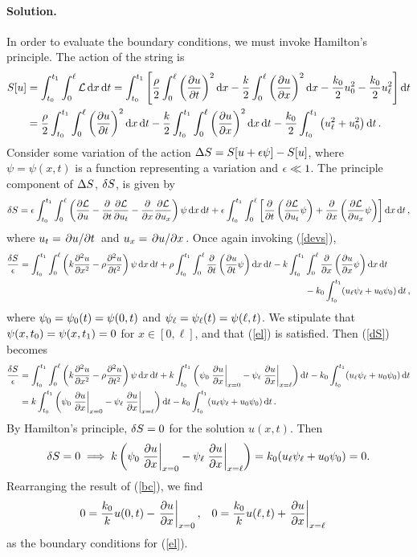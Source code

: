 \documentclass[11pt]{article}
\newcommand{\refeq}[1]{(\ref{#1})}
\newenvironment{solution}
{
    \paragraph{Solution.}
    \ignorespaces
}
{
}
\begin{document}
\begin{solution}
	In order to evaluate the boundary conditions, we must invoke Hamilton's principle.  The action of the string is
	\begin{align} \label{action}
		S[u] &= \int_{t_0}^{t_1} \int_0^\ell \mathcal{L} \dd{x} \dd{t} = \int_{t_0}^{t_1} \left[ \frac{\rho}{2} \int_0^\ell \bigg( \pdv{u}{t} \bigg)^2 \dd{x} - \frac{k}{2} \int_0^\ell \bigg( \pdv{u}{x} \bigg)^2 \dd{x} - \frac{k_0}{2} u_0^2 - \frac{k_0}{2} u_\ell^2 \right] \dd{t} \\
		&= \frac{\rho}{2} \int_{t_0}^{t_1} \int_0^\ell \bigg( \pdv{u}{t} \bigg)^2 \dd{x} \dd{t} - \frac{k}{2} \int_{t_0}^{t_1} \int_0^\ell \bigg( \pdv{u}{x} \bigg)^2 \dd{x} \dd{t} - \frac{k_0}{2} \int_{t_0}^{t_1} \left( u_\ell^2 + u_0^2 \right) \dd{t}.
	\end{align}
	Consider some variation of the action $\Delta S = S[u + \epsilon \psi] - S[u]$, where $\psi = \psi(x, t)$ is a function representing a variation and $\epsilon \ll 1$.  The principle component of $\Delta S$, $\delta S$, is given by
	\begin{equation}
		\delta S = \epsilon \int_{t_0}^{t_1} \int_0^\ell \left( \pdv{\mathcal{L}}{u} - \pdv{}{t} \pdv{\mathcal{L}}{u_t} - \pdv{}{x} \pdv{\mathcal{L}}{u_x} \right) \psi \dd{x} \dd{t} + \epsilon \int_{t_0}^{t_1} \int_0^\ell \left[ \pdv{}{t} \left( \pdv{\mathcal{L}}{u_t} \psi \right) + \pdv{}{x} \left( \pdv{\mathcal{L}}{u_x} \psi \right) \right] \dd{x} \dd{t},
	\end{equation}
	where $u_t = \pdv*{u}{t}$ and $u_x = \pdv*{u}{x}$.  Once again invoking \refeq{devs},
	\begin{align} \label{dS}
		\frac{\delta S}{\epsilon} = \int_{t_0}^{t_1} \int_0^\ell \left( k \pdv[2]{u}{x} - \rho \pdv[2]{u}{t} \right) \psi \dd{x} \dd{t} + \rho \int_{t_0}^{t_1} \int_0^\ell \pdv{}{t} \left( \pdv{u}{t} \psi \right) \dd{x} \dd{t} - k \int_{t_0}^{t_1} &\int_0^\ell \pdv{}{x} \left( \pdv{u}{x} \psi \right) \dd{x} \dd{t} \notag \\
		& - k_0 \int_{t_0}^{t_1} (u_\ell \psi_\ell + u_0 \psi_0) \dd{t} ,
	\end{align}
	where $\psi_0 = \psi_0(t) = \psi(0, t)$ and $\psi_\ell = \psi_\ell(t) = \psi(\ell, t)$.  We stipulate that $\psi(x, t_0) = \psi(x, t_1) = 0$ for $x \in [0, \ell]$, and that \refeq{el} is satisfied.  Then \refeq{dS} becomes
	\begin{align}
		\frac{\delta S}{\epsilon} &= \int_{t_0}^{t_1} \int_0^\ell \left( k \pdv[2]{u}{x} - \rho \pdv[2]{u}{t} \right) \psi \dd{x} \dd{t} + k \int_{t_0}^{t_1} \left( \psi_0 \left. \pdv{u}{x} \right|_{x=0} - \psi_\ell \left. \pdv{u}{x} \right|_{x=\ell} \right) \dd{t} - k_0 \int_{t_0}^{t_1} (u_\ell \psi_\ell + u_0 \psi_0) \dd{t} \label{psit} \\
		&= k \int_{t_0}^{t_1} \left( \psi_0 \left. \pdv{u}{x} \right|_{x=0} - \psi_\ell \left. \pdv{u}{x} \right|_{x=\ell} \right) \dd{t} - k_0 \int_{t_0}^{t_1} (u_\ell \psi_\ell + u_0 \psi_0) \dd{t}.
	\end{align}
	By Hamilton's principle, $\delta S = 0$ for the solution $u(x, t)$.  Then
	\begin{equation} \label{bc}
		\delta S = 0 \implies k \left(\psi_0 \left. \pdv{u}{x} \right|_{x=0} - \psi_\ell \left. \pdv{u}{x} \right|_{x=\ell} \right) = k_0 (u_\ell \psi_\ell + u_0 \psi_0) = 0.
	\end{equation}
	Rearranging the result of \refeq{bc}, we find
	\begin{align} \label{bcs}
		0 &= \frac{k_0}{k} u(0, t) - \left. \pdv{u}{x} \right|_{x=0}, &
		0 &= \frac{k_0}{k} u(\ell, t) + \left. \pdv{u}{x} \right|_{x=\ell}
	\end{align}
	as the boundary conditions for \refeq{el}.
\end{solution}
\end{document}
